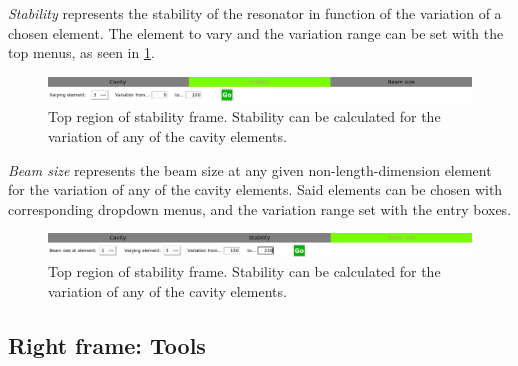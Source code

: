 \documentclass[11pt,a4paper,article,oneside]{memoir}
\begin{document}
		\textit{Stability} represents the stability of the resonator in function of the variation of a chosen element. The element to vary and the variation range can be set with the top menus, as seen in \cref{fig:stability-frame}.
		
		\begin{figure}[h!]
			\centering
			\includegraphics[width=0.8\linewidth]{stability-crop.png}
			\caption[Stability frame]{Top region of stability frame. Stability can be calculated for the variation of any of the cavity elements.}
			\label{fig:stability-frame}
		\end{figure}
	
		\textit{Beam size} represents the beam size at any given non-length-dimension element for the variation of any of the cavity elements. Said elements can be chosen with corresponding dropdown menus, and the variation range set with the entry boxes.
		
		\begin{figure}[h!]
			\centering
			\includegraphics[width=0.8\linewidth]{beamsize-crop.png}
			\caption[Beam size frame]{Top region of stability frame. Stability can be calculated for the variation of any of the cavity elements.}
			\label{fig:beamsize-frame}
		\end{figure}
				
		\newpage
		\subsection{Right frame: Tools}
		
\end{document}
